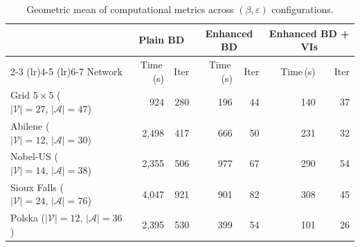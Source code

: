 \begin{table}[t]
\centering
\caption{Geometric mean of computational metrics across $(\beta, \varepsilon)$ configurations.}
\label{tab:computational_geom}
\small
\begin{tabular}{l rr rr rr}
\toprule
 & \multicolumn{2}{c}{\textbf{Plain BD}} & \multicolumn{2}{c}{\textbf{Enhanced BD}} & \multicolumn{2}{c}{\textbf{Enhanced BD + VIs}} \\
\cmidrule(lr){2-3} \cmidrule(lr){4-5} \cmidrule(lr){6-7}
Network & Time\,(s) & Iter & Time\,(s) & Iter & Time\,(s) & Iter \\
\midrule
Grid $5\times5$ {\scriptsize($|\mathcal{V}|\!=\!27,\, |\mathcal{A}|\!=\!47$)} & 924 & 280 & 196 & 44 & 140 & 37 \\
Abilene {\scriptsize($|\mathcal{V}|\!=\!12,\, |\mathcal{A}|\!=\!30$)} & 2,498 & 417 & 666 & 50 & 231 & 32 \\
Nobel-US {\scriptsize($|\mathcal{V}|\!=\!14,\, |\mathcal{A}|\!=\!38$)} & 2,355 & 506 & 977 & 67 & 290 & 54 \\
Sioux Falls {\scriptsize($|\mathcal{V}|\!=\!24,\, |\mathcal{A}|\!=\!76$)} & 4,047 & 921 & 901 & 82 & 308 & 45 \\
Polska {\scriptsize($|\mathcal{V}|\!=\!12,\, |\mathcal{A}|\!=\!36$)} & 2,395 & 530 & 399 & 54 & 101 & 26 \\
\bottomrule
\end{tabular}
\end{table}
